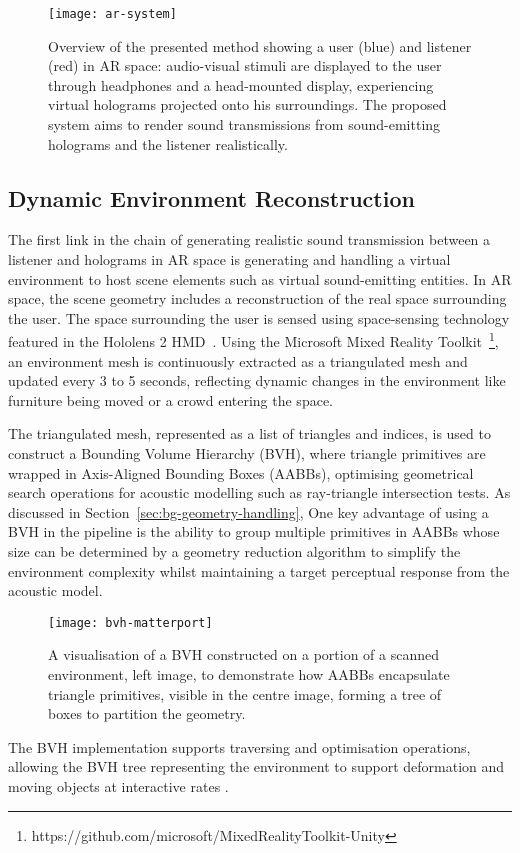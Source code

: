 \begin{figure}[htb]
    \centering
    \texttt{[image: ar-system]}
    \caption{Overview of the presented method showing a user (blue) and listener (red) in AR space: audio-visual stimuli are displayed to the user through headphones and a head-mounted display, experiencing virtual holograms projected onto his surroundings. The proposed system aims to render sound transmissions from sound-emitting holograms and the listener realistically.}
\label{fig:method-overview}
\end{figure}

\subsection{Dynamic Environment Reconstruction}
The first link in the chain of generating realistic sound transmission between a listener and holograms in AR space is generating and handling a virtual environment to host scene elements such as virtual sound-emitting entities. In AR space, the scene geometry includes a reconstruction of the real space surrounding the user. The space surrounding the user is sensed using space-sensing technology featured in the Hololens 2 HMD~\citep{ungureanu2020hololens}. Using the Microsoft Mixed Reality Toolkit~\footnote{https://github.com/microsoft/MixedRealityToolkit-Unity}, an environment mesh is continuously extracted as a triangulated mesh and updated every 3 to 5 seconds, reflecting dynamic changes in the environment like furniture being moved or a crowd entering the space.\par
The triangulated mesh, represented as a list of triangles and indices, is used to construct a Bounding Volume Hierarchy (BVH), where triangle primitives are wrapped in Axis-Aligned Bounding Boxes (AABBs), optimising geometrical search operations for acoustic modelling such as ray-triangle intersection tests. As discussed in Section~\ref{sec:bg-geometry-handling}, One key advantage of using a BVH in the pipeline is the ability to group multiple primitives in AABBs whose size can be determined by a geometry reduction algorithm to simplify the environment complexity whilst maintaining a target perceptual response from the acoustic model. \par
\begin{figure}[htb]
    \centering
    \texttt{[image: bvh-matterport]}
    \caption{A visualisation of a BVH constructed on a portion of a scanned environment, left image, to demonstrate how AABBs encapsulate triangle primitives, visible in the centre image, forming a tree of boxes to partition the geometry.}
\label{fig:bvh-visualisation}
\end{figure}
The BVH implementation supports traversing and optimisation operations, allowing the BVH tree representing the environment to support deformation and moving objects at interactive rates \citep{wald2007ray}.

